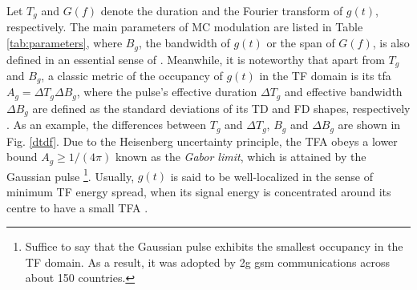 \documentclass[journal]{IEEEtran}
\begin{document}
Let $T_g$ and $G(f)$ denote the duration and the Fourier transform of $g(t)$, respectively.
The main parameters of MC modulation are listed in Table \ref{tab:parameters}, where
$B_g$, the bandwidth of $g(t)$ or the span of $G(f)$, is also defined in an essential sense of \cite{onbandwidth}.
Meanwhile, it is noteworthy that apart from $T_g$ and $B_g$, a classic metric of the occupancy of $g(t)$ in the TF domain is its \ac{tfa} $A_g =\Delta T_g\Delta B_g$, where the pulse's effective duration $\Delta T_g$ and effective bandwidth $\Delta B_g$ are defined as the standard deviations of its TD and FD shapes, respectively \cite{gabor,haas_wpc_97}.
As an example, the differences between $T_g$ and $\Delta T_g$,  $B_g$ and $\Delta B_g$ are shown in Fig. \ref{dtdf}.
Due to the Heisenberg uncertainty principle, the TFA obeys a lower bound $A_g\ge 1/(4\pi)$ known as the \emph{Gabor limit}, which is attained by the Gaussian pulse \cite{gabor}\footnote{Suffice to say that the Gaussian pulse exhibits the smallest occupancy in the TF domain. As a result, it was adopted by \ac{2g} \ac{gsm} communications across about 150 countries.}.
Usually, $g(t)$ is said to be well-localized in the sense of minimum TF energy spread, when its signal energy is concentrated around its centre to have a small TFA \cite{haas_wpc_97}.
\end{document}
